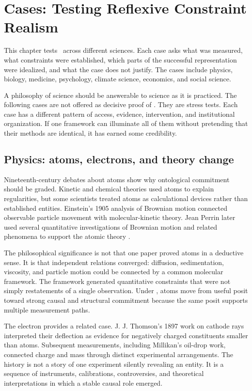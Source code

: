 \chapter{Cases: Testing Reflexive Constraint Realism}
\label{ch:cases}

\begin{chapterguide}
This chapter tests \RCR\ across different sciences. Each case asks what was
measured, what constraints were established, which parts of the successful
representation were idealized, and what the case does not justify. The cases
include physics, biology, medicine, psychology, climate science, economics,
and social science.
\end{chapterguide}

A philosophy of science should be answerable to science as it is practiced.
The following cases are not offered as decisive proof of \RCR. They are stress
tests. Each case has a different pattern of access, evidence, intervention, and
institutional organization. If one framework can illuminate all of them
without pretending that their methods are identical, it has earned some
credibility.

\section{Physics: atoms, electrons, and theory change}

Nineteenth-century debates about atoms show why ontological commitment should
be graded. Kinetic and chemical theories used atoms to explain regularities,
but some scientists treated atoms as calculational devices rather than
established entities. Einstein's 1905 analysis of Brownian motion connected
observable particle movement with molecular-kinetic theory. Jean Perrin later
used several quantitative investigations of Brownian motion and related
phenomena to support the atomic theory \citep{einstein1905,perrin1913}.

The philosophical significance is not that one paper proved atoms in a
deductive sense. It is that independent relations converged: diffusion,
sedimentation, viscosity, and particle motion could be connected by a common
molecular framework. The framework generated quantitative constraints that
were not simply restatements of a single observation. Under \RCR, atoms move
from useful posit toward strong causal and structural commitment because the
same posit supports multiple measurement paths.

The electron provides a related case. J. J. Thomson's 1897 work on cathode
rays interpreted their deflection as evidence for negatively charged
constituents smaller than atoms. Subsequent measurements, including
Millikan's oil-drop work, connected charge and mass through distinct
experimental arrangements. The history is not a story of one experiment
silently revealing an entity. It is a sequence of instruments, calibrations,
controversies, and theoretical interpretations in which a stable causal role
emerged.


